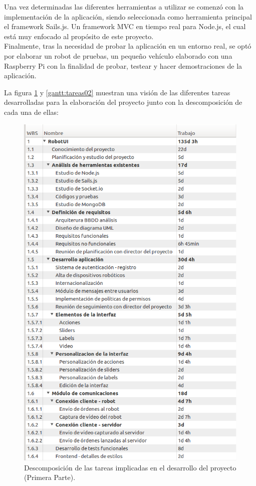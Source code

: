 \documentclass[a4paper,12pt]{article}
\begin{document}
Una vez determinadas las diferentes herramientas a utilizar se comenzó con la implementación de la aplicación, siendo seleccionada como herramienta principal el framework Sails.js. Un framework MVC en 
tiempo real para Node.js, el cual está muy enfocado al propósito de este proyecto.\\

Finalmente, tras la necesidad de probar la aplicación en un entorno real, se optó por elaborar un robot de pruebas, un pequeño vehículo elaborado con una Raspberry Pi con la finalidad de probar, testear y hacer 
demostraciones de la aplicación.

La figura \ref{gantt:tareas01} y \ref{gantt:tareas02} muestran una visión de las diferentes tareas desarrolladas para la elaboración del proyecto junto con la descomposición de cada una de ellas:\\

\begin{figure}
  \begin{center}
    \includegraphics[scale=0.6]{imagenes/descomposicion_tareas01.png}
  \end{center}
  \caption{Descomposición de las tareas implicadas en el desarrollo del proyecto (Primera Parte).}
  \label{gantt:tareas01}
\end{figure}
\end{document}
